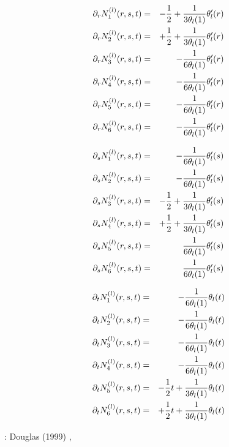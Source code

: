 \begin{eqnarray}
\partial_r N_1^{(l)}(r,s,t) &=&  - \frac12  + \frac{1}{3\theta_l(1)}\theta_l'(r)  \nonumber\\
\partial_r N_2^{(l)}(r,s,t) &=&  + \frac12  + \frac{1}{3\theta_l(1)}\theta_l'(r)  \nonumber\\
\partial_r N_3^{(l)}(r,s,t) &=&  -\frac{1}{6\theta_l(1)}\theta_l'(r)  \nonumber\\
\partial_r N_4^{(l)}(r,s,t) &=&  -\frac{1}{6\theta_l(1)}\theta_l'(r)  \nonumber\\
\partial_r N_5^{(l)}(r,s,t) &=&  -\frac{1}{6\theta_l(1)}\theta_l'(r)  \nonumber\\
\partial_r N_6^{(l)}(r,s,t) &=&  -\frac{1}{6\theta_l(1)}\theta_l'(r)  
\end{eqnarray}

\begin{eqnarray}
\partial_s N_1^{(l)}(r,s,t) &=&   -\frac{1}{6\theta_l(1)}\theta_l'(s) \nonumber\\
\partial_s N_2^{(l)}(r,s,t) &=&   -\frac{1}{6\theta_l(1)}\theta_l'(s) \nonumber\\
\partial_s N_3^{(l)}(r,s,t) &=& - \frac12  + \frac{1}{3\theta_l(1)}\theta_l'(s)  \nonumber\\
\partial_s N_4^{(l)}(r,s,t) &=& + \frac12  + \frac{1}{3\theta_l(1)}\theta_l'(s)  \nonumber\\
\partial_s N_5^{(l)}(r,s,t) &=&   \frac{1}{6\theta_l(1)}\theta_l'(s)  \nonumber\\
\partial_s N_6^{(l)}(r,s,t) &=&   \frac{1}{6\theta_l(1)}\theta_l'(s)  
\end{eqnarray}

\begin{eqnarray}
\partial_t N_1^{(l)}(r,s,t) &=& - \frac{1}{6\theta_l(1)}\theta_l(t)  \nonumber\\
\partial_t N_2^{(l)}(r,s,t) &=& - \frac{1}{6\theta_l(1)}\theta_l(t)  \nonumber\\
\partial_t N_3^{(l)}(r,s,t) &=& - \frac{1}{6\theta_l(1)}\theta_l(t)  \nonumber\\
\partial_t N_4^{(l)}(r,s,t) &=& - \frac{1}{6\theta_l(1)}\theta_l(t)  \nonumber\\
\partial_t N_5^{(l)}(r,s,t) &=& - \frac12 t + \frac{1}{3\theta_l(1)}\theta_l(t)  \nonumber\\
\partial_t N_6^{(l)}(r,s,t) &=& + \frac12 t + \frac{1}{3\theta_l(1)}\theta_l(t)  
\end{eqnarray}

\Literature: Douglas \etal (1999) \cite{doss99}, 
